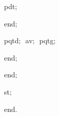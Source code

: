 {\vspace{\neglskip}\mbox{\blc  \blk\blk\blk\blk\blk\blk\blk\idt  pdt$;$\ }\par 
\vspace{\neglskip}\mbox{\blc  \blk\blk\blk\blk\blk\blk\idt  \mcl end\idt $;$}\par 
\vspace{\neglskip}\mbox{\blc  \blk\blk\blk\blk\blk\idt  pqtd$;$\ av$;$\ pqtg$;$\ }\par 
\vspace{\neglskip}\mbox{\blc  \blk\blk\blk\blk\idt  \mcl end\idt $;$}\par 
\vspace{\neglskip}\mbox{\blc  \blk\blk\idt  \mcl end\idt $;$}\par 
\vspace{\neglskip}\mbox{\blc  \blk\idt  st$;$}\par 
\vspace{\neglskip}\mbox{\blc  \idt  \mcl end\idt $.$}\par 

\medskip }

